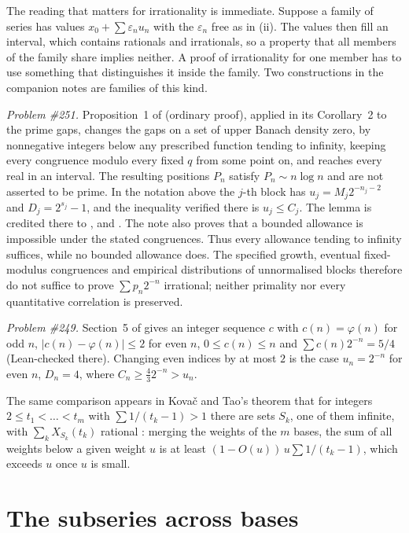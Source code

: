 \documentclass[11pt]{article}
\begin{document}
The reading that matters for irrationality is immediate.  Suppose a family of
series has values $x_0+\sum\varepsilon_nu_n$ with the $\varepsilon_n$ free as in
(ii).  The values then fill an interval, which contains rationals and
irrationals, so a property that all members of the family share implies
neither.  A proof of irrationality for one member has to use something that
distinguishes it inside the family.  Two constructions in the companion notes
are families of this kind.

\emph{Problem \#251.}  Proposition~1 of \cite{plectis251} (ordinary proof),
applied in its Corollary~2 to the prime gaps, changes the gaps on a set of upper
Banach density zero, by nonnegative integers below any prescribed function
tending to infinity, keeping every congruence modulo every fixed $q$ from some
point on, and reaches every real in an interval.  The resulting positions
$P_n$ satisfy $P_n\sim n\log n$ and are not asserted to be prime.  In the notation above the $j$-th block has $u_j=M_j2^{-n_j-2}$ and
$D_j=2^{s_j}-1$, and the inequality verified there is $u_j\le C_j$.  The
lemma is credited there to \cite{fridy1966}, \cite[Lemma~4]{crmarickovac2025}
and \cite[Lemma~5.1]{kovactao2024}.  The note also proves that a bounded
allowance is impossible under the stated congruences.  Thus every allowance
tending to infinity suffices, while no bounded allowance does.  The specified
growth, eventual fixed-modulus congruences and empirical distributions of
unnormalised blocks therefore do not suffice to prove
$\sum p_n2^{-n}$ irrational; neither primality nor every quantitative
correlation is preserved.

\emph{Problem \#249.}  Section~5 of \cite{plectis249} gives an integer sequence
$c$ with $c(n)=\varphi(n)$ for odd $n$, $|c(n)-\varphi(n)|\le2$ for even $n$,
$0\le c(n)\le n$ and $\sum c(n)2^{-n}=5/4$ (Lean-checked there).  Changing even
indices by at most $2$ is the case $u_n=2^{-n}$ for even $n$, $D_n=4$, where
$C_n\ge\tfrac43 2^{-n}>u_n$.

The same comparison appears in Kova\v{c} and Tao's theorem that for integers
$2\le t_1<\dots<t_m$ with $\sum1/(t_k-1)>1$ there are sets $S_k$, one of them
infinite, with $\sum_kX_{S_k}(t_k)$ rational \cite[Theorem~2.3]{kovactao2024}:
merging the weights of the $m$ bases, the sum of all weights below a given
weight $u$ is at least $(1-O(u))\,u\sum1/(t_k-1)$, which exceeds $u$ once $u$
is small.

\section{The subseries across bases}\label{sec:bases}
\end{document}
